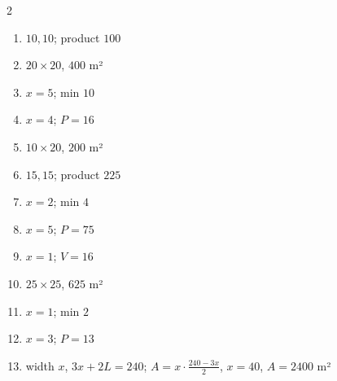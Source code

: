 \documentclass[11pt]{article}
\begin{document}
\begin{keybox}
\begin{multicols}{2}
\small
\begin{enumerate}[leftmargin=*,itemsep=3pt]
  \item $10,10$; product $100$
  \item $20\times20$, $400$ m²
  \item $x=5$; min $10$
  \item $x=4$; $P=16$
  \item $10\times20$, $200$ m²
  \item $15,15$; product $225$
  \item $x=2$; min $4$
  \item $x=5$; $P=75$
  \item $x=1$; $V=16$
  \item $25\times25$, $625$ m²
  \item $x=1$; min $2$
  \item $x=3$; $P=13$
  \item width $x$, $3x+2L=240$; $A=x\cdot\tfrac{240-3x}{2}$, $x=40$, $A=2400$ m²
\end{enumerate}
\end{multicols}
\end{keybox}
\end{document}
